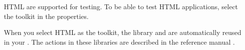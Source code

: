  HTML \gdauts{} are supported for testing. To be able to test HTML applications, select the  toolkit in the \gdproject{} properties. 

When you select HTML as the \gdproject{} toolkit, the library \gdprojects{}  and   are automatically reused in your \gdproject{}. The actions in these libraries are described in the reference manual .

